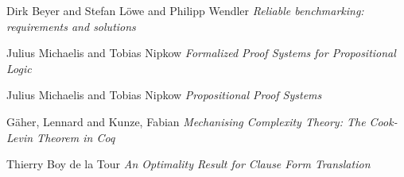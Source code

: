 \begin{thebibliography}{9}
Dirk Beyer and
               Stefan L{\"{o}}we and
               Philipp Wendler
\textit{Reliable benchmarking: requirements and solutions}

Julius Michaelis and
               Tobias Nipkow
\textit{Formalized Proof Systems for Propositional Logic}

Julius Michaelis and Tobias Nipkow
\textit{Propositional Proof Systems}

G\"{a}her, Lennard and Kunze, Fabian
\textit{Mechanising Complexity Theory: The Cook-Levin Theorem in Coq}

Thierry Boy de la Tour
\textit{An Optimality Result for Clause Form Translation}








\end{thebibliography}